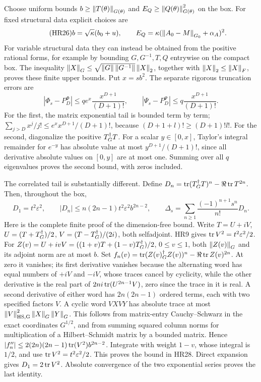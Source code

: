 Choose uniform bounds \(b\ge\left\lVert T(\theta)\right\rVert_{G(\theta)}\) and
\(E_Q\ge\left\lVert Q(\theta)\right\rVert_{G(\theta)}^2\) on the box.
For fixed structural data explicit choices are
\begin{equation}\tag{HR26}\label{hrv:HR26}
b=\sqrt\kappa(b_0+u),\qquad
E_Q=\kappa(\left\lVert A_0-M\right\rVert_{G_0}+\alpha_A)^2.
\end{equation}
For variable structural data they can instead be obtained from the
positive rational forms, for example by bounding \(G,G^{-1},T,Q\)
entrywise on the compact box. The inequality
\(\left\lVert X\right\rVert_G\le\sqrt{\left\lVert G\right\rVert\left\lVert G^{-1}\right\rVert}\left\lVert X\right\rVert_2\), together
with \(\left\lVert X\right\rVert_2\le\left\lVert X\right\rVert_F\), proves these finite upper bounds.
Put \(x=sb^2\). The separate rigorous truncation errors are
\begin{equation}\tag{HR27}\label{hrv:HR27}
|\Phi_s-P_D^\Phi|\le q e^x\frac{x^{D+1}}{(D+1)!},\qquad
|\Psi_s-P_D^\Psi|\le q\frac{x^{D+1}}{(D+1)!}.
\end{equation}
For the first, the matrix exponential tail is bounded term by term;
\(\sum_{j>D}x^j/j!\le e^x x^{D+1}/(D+1)!\), because
\((D+1+l)!\ge(D+1)!l!\). For the second, diagonalize the positive
\(T^\dagger_G T\). For a scalar \(y\in[0,x]\), Taylor's integral remainder
for \(e^{-y}\) has absolute value at most \(y^{D+1}/(D+1)!\), since
all derivative absolute values on \([0,y]\) are at most one. Summing
over all \(q\) eigenvalues proves the second bound, with zeros included.

The correlated tail is substantially different. Define
\(D_n=\operatorname{tr}(T^\dagger_G T)^n-\Re\operatorname{tr} T^{2n}\). Then, throughout the box,
\begin{equation}\tag{HR28}\label{hrv:HR28}
D_1=t^2\varepsilon^2,\qquad
|D_n|\le n(2n-1)t^2\varepsilon^2 b^{2n-2},\qquad
\Delta_s=\sum_{n\ge1}\frac{(-1)^{n+1}s^n}{n!}D_n.
\end{equation}
Here is the complete finite proof of the dimension-free bound. Write
\(T=U+iV\), \(U=(T+T^\dagger_G)/2\), \(V=(T-T^\dagger_G)/(2i)\), both
selfadjoint. HR9 gives \(\operatorname{tr} V^2=t^2\varepsilon^2/2\).
For \(Z(v)=U+ivV=((1+v)T+(1-v)T^\dagger_G)/2\), \(0\le v\le1\),
both \(\left\lVert Z(v)\right\rVert_G\) and its adjoint norm are at most \(b\).
Set \(f_n(v)=\operatorname{tr}(Z(v)^\dagger_G Z(v))^n-\Re\operatorname{tr} Z(v)^{2n}\).
At zero it vanishes; its first derivative vanishes because the alternating
word has equal numbers of \(+iV\) and \(-iV\), whose traces cancel by
cyclicity, while the other derivative is the real part of
\(2ni\operatorname{tr}(U^{2n-1}V)\), zero since the trace in it is real.
A second derivative of either word has \(2n(2n-1)\) ordered terms,
each with two specified factors \(V\). A cyclic word \(VX VY\) has
absolute trace at most \(\left\lVert V\right\rVert_{\rm HS,G}^2\left\lVert X\right\rVert_G\left\lVert Y\right\rVert_G\).
This follows from matrix-entry Cauchy--Schwarz in the exact coordinates
\(G^{1/2}\), and from summing squared column norms for multiplication
of a Hilbert--Schmidt matrix by a bounded matrix. Hence
\(|f_n''|\le2(2n)(2n-1)\operatorname{tr}(V^2)b^{2n-2}\).
Integrate with weight \(1-v\), whose integral is \(1/2\), and use
\(\operatorname{tr} V^2=t^2\varepsilon^2/2\). This proves the bound in HR28.
Direct expansion gives \(D_1=2\operatorname{tr} V^2\). Absolute convergence of the
two exponential series proves the last identity.

